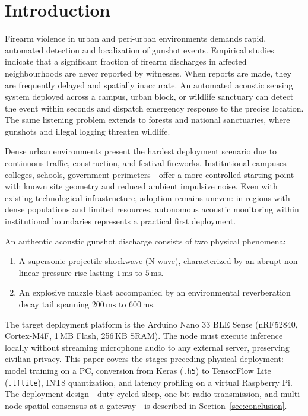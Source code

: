 \documentclass[conference]{IEEEtran}
\begin{document}
\section{Introduction}
\label{sec:intro}

Firearm violence in urban and peri-urban environments demands rapid, automated detection and localization of gunshot events. Empirical studies indicate that a significant fraction of firearm discharges in affected neighbourhoods are never reported by witnesses. When reports are made, they are frequently delayed and spatially inaccurate. An automated acoustic sensing system deployed across a campus, urban block, or wildlife sanctuary can detect the event within seconds and dispatch emergency response to the precise location. The same listening problem extends to forests and national sanctuaries, where gunshots and illegal logging threaten wildlife.

Dense urban environments present the hardest deployment scenario due to continuous traffic, construction, and festival fireworks. Institutional campuses---colleges, schools, government perimeters---offer a more controlled starting point with known site geometry and reduced ambient impulsive noise. Even with existing technological infrastructure, adoption remains uneven: in regions with dense populations and limited resources, autonomous acoustic monitoring within institutional boundaries represents a practical first deployment.

An authentic acoustic gunshot discharge consists of two physical phenomena:
\begin{enumerate}
    \item A supersonic projectile shockwave (N-wave), characterized by an abrupt non-linear pressure rise lasting $1\,\text{ms}$ to $5\,\text{ms}$.
    \item An explosive muzzle blast accompanied by an environmental reverberation decay tail spanning $200\,\text{ms}$ to $600\,\text{ms}$.
\end{enumerate}

The target deployment platform is the Arduino Nano 33 BLE Sense (nRF52840, Cortex-M4F, 1\,MB Flash, 256\,KB SRAM). The node must execute inference locally without streaming microphone audio to any external server, preserving civilian privacy. This paper covers the stages preceding physical deployment: model training on a PC, conversion from Keras (\texttt{.h5}) to TensorFlow Lite (\texttt{.tflite}), INT8 quantization, and latency profiling on a virtual Raspberry Pi. The deployment design---duty-cycled sleep, one-bit radio transmission, and multi-node spatial consensus at a gateway---is described in Section~\ref{sec:conclusion}.
\end{document}
